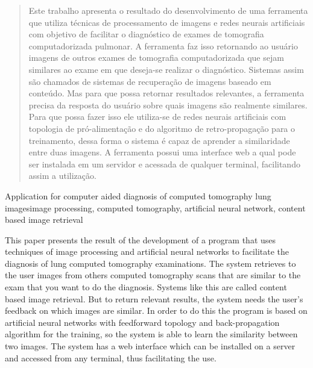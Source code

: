 \begin{abstract}
Este trabalho apresenta o resultado do desenvolvimento de uma ferramenta que utiliza técnicas de processamento de imagens e redes neurais artificiais com objetivo de facilitar o diagnóstico de exames de tomografia computadorizada pulmonar. A ferramenta faz isso retornando ao usuário imagens de outros exames de tomografia computadorizada que sejam similares ao exame em que deseja-se realizar o diagnóstico. Sistemas assim são chamados de sistemas de recuperação de imagens baseado em conteúdo. Mas para que possa retornar resultados relevantes, a ferramenta precisa da resposta do usuário sobre quais imagens são realmente similares. Para que possa fazer isso ele utiliza-se de redes neurais artificiais com topologia de pró-alimentação e do algoritmo de retro-propagação para o treinamento, dessa forma o sistema é capaz de aprender a similaridade entre duas imagens. A ferramenta possui uma interface web a qual pode ser instalada em um servidor e acessada de qualquer terminal, facilitando assim a utilização.
\end{abstract}


\begin{englishabstract}{Application for computer aided diagnosis of computed tomography lung images}{image processing, computed tomography, artificial neural network, content based image retrieval}

This paper presents the result of the development of a program that uses techniques of image processing and artificial neural networks to facilitate the diagnosis of lung computed tomography examinations. The system retrieves to the user images from others computed tomography scans that are similar to the exam that you want to do the diagnosis. Systems like this are called content based image retrieval. But to return relevant results, the system needs the user's feedback on which images are similar. In order to do this the program is based on artificial neural networks with feedforward topology and back-propagation algorithm for the training, so the system is able to learn the similarity between two images. The system has a web interface which can be installed on a server and accessed from any terminal, thus facilitating the use.
\end{englishabstract}